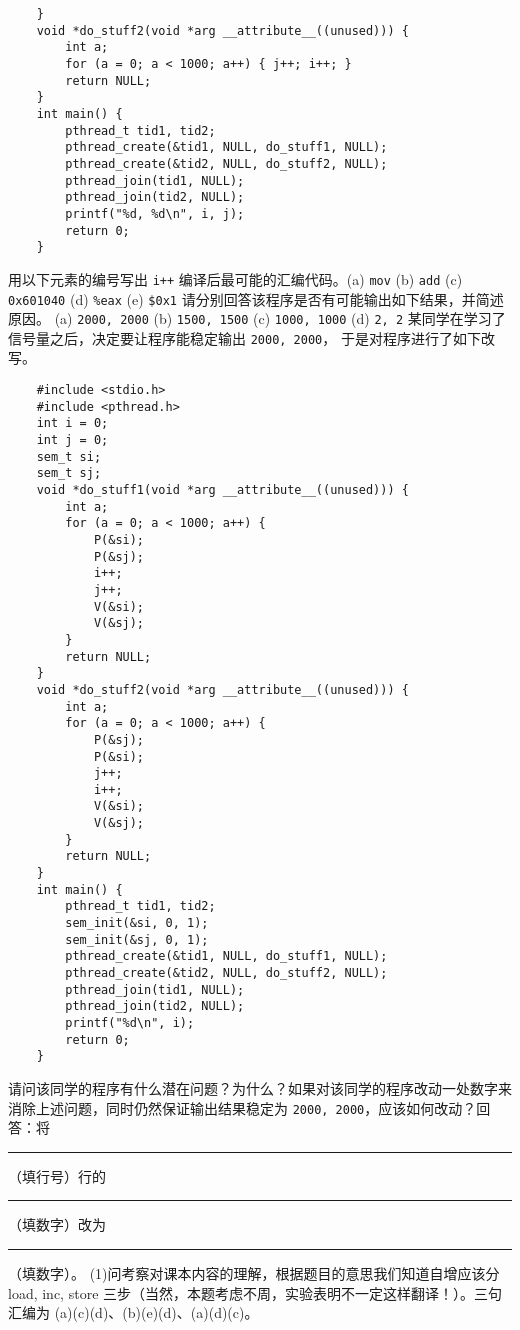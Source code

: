 \begin{problems}
\begin{verbatim}
    }
    void *do_stuff2(void *arg __attribute__((unused))) {
        int a;
        for (a = 0; a < 1000; a++) { j++; i++; }
        return NULL;
    }
    int main() {
        pthread_t tid1, tid2;
        pthread_create(&tid1, NULL, do_stuff1, NULL);
        pthread_create(&tid2, NULL, do_stuff2, NULL);
        pthread_join(tid1, NULL);
        pthread_join(tid2, NULL);
        printf("%d, %d\n", i, j);
        return 0;
    }
        \end{verbatim}
            \qn 用以下元素的编号写出  \verb|i++| 编译后最可能的汇编代码。(a) \verb|mov| (b) \verb|add| (c) \verb|0x601040| (d) \verb|%eax| (e) \verb|$0x1|
            \qn 请分别回答该程序是否有可能输出如下结果，并简述原因。 (a) \verb|2000, 2000| (b) \verb|1500, 1500| (c) \verb|1000, 1000| (d) \verb|2, 2|
            \qn 某同学在学习了信号量之后，决定要让程序能稳定输出 \verb|2000, 2000|， 于是对程序进行了如下改写。
            \begin{verbatim}
    #include <stdio.h>
    #include <pthread.h>
    int i = 0;
    int j = 0;
    sem_t si;
    sem_t sj;
    void *do_stuff1(void *arg __attribute__((unused))) {
        int a;
        for (a = 0; a < 1000; a++) {
            P(&si);
            P(&sj);
            i++;
            j++;
            V(&si);
            V(&sj);
        }
        return NULL;
    }
    void *do_stuff2(void *arg __attribute__((unused))) {
        int a;
        for (a = 0; a < 1000; a++) {
            P(&sj);
            P(&si);
            j++;
            i++;
            V(&si);
            V(&sj);
        }
        return NULL;
    }
    int main() {
        pthread_t tid1, tid2;
        sem_init(&si, 0, 1);
        sem_init(&sj, 0, 1);
        pthread_create(&tid1, NULL, do_stuff1, NULL); 
        pthread_create(&tid2, NULL, do_stuff2, NULL);
        pthread_join(tid1, NULL);
        pthread_join(tid2, NULL);
        printf("%d\n", i);
        return 0;
    }
        \end{verbatim}
        请问该同学的程序有什么潜在问题？为什么？如果对该同学的程序改动一处数字来消除上述问题，同时仍然保证输出结果稳定为 \verb|2000, 2000|，应该如何改动？回答：将 \rule{2.5cm}{0.25mm} （填行号）行的 \rule{2.5cm}{0.25mm}（填数字）改为 \rule{2.5cm}{0.25mm}（填数字）。
        \sol (1)问考察对课本内容的理解，根据题目的意思我们知道自增应该分 load, inc, store 三步（当然，本题考虑不周，实验表明不一定这样翻译！）。三句汇编为 (a)(c)(d)、(b)(e)(d)、(a)(d)(c)。


\end{problems}
